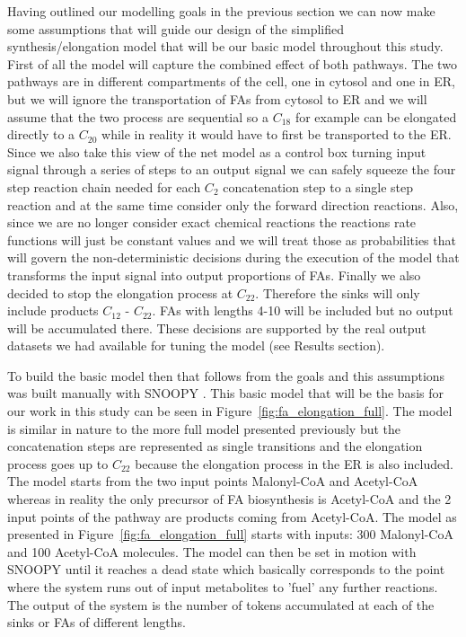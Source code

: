 Having outlined our modelling goals in the previous section we can now
make some assumptions that will guide our design of the simplified
synthesis/elongation model that will be our basic model throughout
this study. First of all the model will capture the combined effect of
both pathways. The two pathways are in different compartments of
the cell, one in cytosol and one in ER, but we will ignore the
transportation of FAs from cytosol to ER and we will assume that the
two process are sequential so a $C_{18}$ for example can be elongated
directly to a $C_{20}$ while in reality it would have to first be
transported to the ER. Since we also take this view of the
net model as a control box turning input signal through a series of
steps to an output signal we can safely squeeze the four step reaction chain
needed for each $C_2$ concatenation step to a single step reaction and
at the same time consider only the forward direction
reactions. Also, since we are no longer consider exact chemical
reactions the reactions rate functions will just be constant values
and we will treat those as probabilities that will govern the
non-deterministic decisions during the execution of the model that
transforms the input signal into output proportions of FAs. Finally we
also decided to stop the elongation process at $C_{22}$. Therefore the
sinks will only include products $C_{12}$ - $C_{22}$. FAs with lengths
4-10 will be included but no output will be accumulated there. These
decisions are supported by the real output datasets we had available
for tuning the model (see
Results section).

To build the basic model then that follows from the goals and this
assumptions was built manually with SNOOPY \cite [] {heiner2012snoopy}. This basic model that will
be the basis for our work in this study can be seen in
Figure~\ref{fig:fa_elongation_full}. The model is similar in nature to
the more full model presented previously but the concatenation steps
are represented as single transitions and the elongation process goes
up to $C_{22}$ because the elongation process in the ER is also
included. The model starts from the two input points Malonyl-CoA
and Acetyl-CoA whereas in reality the only precursor of FA
biosynthesis is Acetyl-CoA and the 2 input points of the pathway are
products coming from Acetyl-CoA. The model as presented in
Figure~\ref{fig:fa_elongation_full} starts with inputs: 300
Malonyl-CoA and 100 Acetyl-CoA molecules. The model can then be set in
motion with SNOOPY until it reaches a dead state which basically
corresponds to the point where the system runs out of input
metabolites to 'fuel' any further reactions. The output of the system
is the number of tokens accumulated at each of the sinks or FAs of
different lengths.

